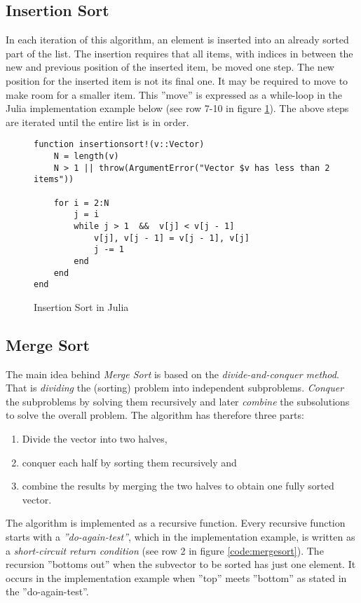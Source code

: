 \documentclass[a4paper, 11pt]{article}
\begin{document}
    \clearpage
    \subsection*{Insertion Sort}
    In each iteration of this algorithm, an element is inserted into an 
    already sorted part of the list.  The insertion requires that all items,
    with indices in between the new and previous position of the inserted item, 
    be moved one step. The new position for the inserted item is not its final one.
    It may be required to move to make room for a smaller item.
    This ''move'' is expressed as a while-loop in the Julia 
    implementation example below (see row 7-10 in figure
    \ref{code:insertionsort}). The above steps are 
    iterated until the entire list is in order. 

        
    \begin{figure}[H]
    \begin{verbatim}
function insertionsort!(v::Vector)
    N = length(v)
    N > 1 || throw(ArgumentError("Vector $v has less than 2 items"))

    for i = 2:N
        j = i
        while j > 1  &&  v[j] < v[j - 1]
            v[j], v[j - 1] = v[j - 1], v[j]
            j -= 1
        end
    end
end
    \end{verbatim}
    \caption{Insertion Sort in Julia}
    \label{code:insertionsort}
    \end{figure}
    
    \clearpage
    \subsection*{Merge Sort}
    The main idea behind \emph{Merge Sort} is based on the
    \emph{divide-and-conquer method}.
    That is \emph{dividing} the (sorting) problem into independent subproblems. 
    \emph{Conquer} the subproblems by solving them recursively and later \emph{combine} the 
    subsolutions to solve the overall problem. 
    The algorithm has therefore three parts:
    \begin{enumerate}
        \item Divide the vector into two halves,
        \item conquer each half by sorting them recursively and
        \item combine the results by merging the two halves to obtain one fully
        sorted vector.
    \end{enumerate}
    The algorithm is implemented as a recursive function. 
    Every recursive function starts with a \emph{''do-again-test''},
    which in the implementation example, 
    is written as a \emph{short-circuit return condition} 
    (see row 2 in figure \ref{code:mergesort}).
    The recursion ''bottoms out'' when the subvector to be sorted has just one
    element. It occurs in the implementation example when ''top'' meets ''bottom'' 
    as stated in the ''do-again-test''. 
\end{document}
